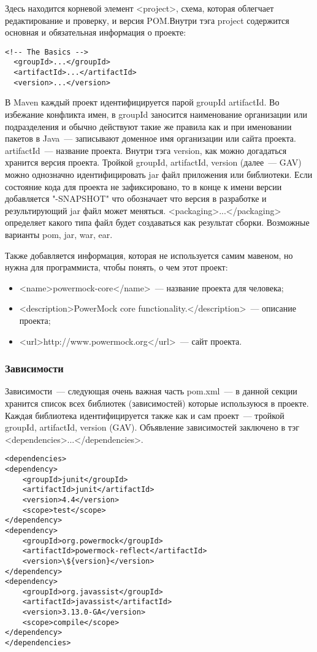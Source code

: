 Здесь находится корневой элемент <project>, схема, которая облегчает редактирование и проверку, и версия POM.Внутри тэга project содержится основная и обязательная информация о проекте:

\begin{lstlisting}
<!-- The Basics -->
  <groupId>...</groupId>
  <artifactId>...</artifactId>
  <version>...</version>
\end{lstlisting}

В Maven каждый проект идентифицируется парой groupId artifactId. Во избежание конфликта имен, в groupId заносится наименование организации или подразделения и обычно действуют такие же правила как и при именовании пакетов в Java~--- записывают доменное имя организации или сайта проекта. artifactId~--- название проекта. Внутри тэга version, как можно догадаться хранится версия проекта. Тройкой groupId, artifactId, version (далее~--- GAV) можно однозначно идентифицировать jar файл приложения или библиотеки. Если состояние кода для проекта не зафиксировано, то в конце к имени версии добавляется "-SNAPSHOT" что обозначает что версия в разработке и результирующий jar файл может меняться. <packaging>...</packaging> определяет какого типа файл будет создаваться как результат сборки. Возможные варианты pom, jar, war, ear.

Также добавляется информация, которая не используется самим мавеном, но нужна для программиста, чтобы понять, о чем этот проект:
\begin{itemize}
\item<name>powermock-core</name>~--- название проекта для человека;
\item<description>PowerMock core functionality.</description>~--- описание проекта;
\item<url>http://www.powermock.org</url>~--- сайт проекта.
\end{itemize}

\subsubsection{Зависимости}
Зависимости~--- следующая очень важная часть pom.xml~--- в данной секции хранится список всех библиотек (зависимостей) которые используюся в проекте. Каждая библиотека идентифицируется также как и сам проект~--- тройкой groupId, artifactId, version (GAV). Объявление зависимостей заключено в тэг <dependencies>...</dependencies>.

\begin{lstlisting}
<dependencies>
<dependency>
    <groupId>junit</groupId>
    <artifactId>junit</artifactId>
    <version>4.4</version>
    <scope>test</scope>
</dependency>
<dependency>
    <groupId>org.powermock</groupId>
    <artifactId>powermock-reflect</artifactId>
    <version>\${version}</version>
</dependency>
<dependency>
    <groupId>org.javassist</groupId>
    <artifactId>javassist</artifactId>
    <version>3.13.0-GA</version>
    <scope>compile</scope>
</dependency>
</dependencies>
\end{lstlisting}

